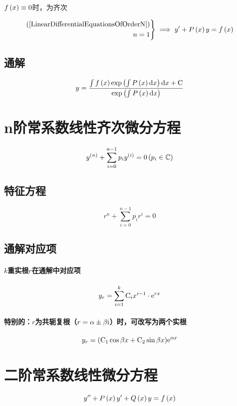 \documentclass{article}
\begin{document}
$f\left(x\right)\equiv0$时，为齐次

\[\left.\begin{aligned}
        \left(\ref{LinearDifferentialEquationsOfOrderN}\right) \\
        n=1
    \end{aligned}\right\}
    \implies
    y^\prime+P\left(x\right)y=f\left(x\right)\]

\subsection{通解}

\[y=\frac{\int{f\left(x\right)\exp\left(\int P\left(x\right)\mathrm dx\right)\mathrm dx}+\mathrm C}{\exp\left(\int P\left(x\right)\mathrm d x\right)}\]

\section{n阶常系数线性齐次微分方程}

\[y^{\left(n\right)}+\sum_{i=0}^{n-1}p_iy^{\left(i\right)}=0\left(p_i\in\mathbb C\right)\]

\subsection{特征方程}

\[r^n+\sum_{i=0}^{n-1}p_ir^i=0\]

\subsection{通解对应项}

\paragraph{$k$重实根$r$在通解中对应项}

\[y_r=\sum_{i=1}^k\mathrm C_ix^{i-1}\cdot\mathrm e^{rx}\]

\paragraph{特别的：$r$为共轭复根（$r=\alpha\pm\beta\mathrm i$）时，可改写为两个实根}

\[y_r=(\mathrm C_1\cos{\beta x}+\mathrm C_2\sin{\beta x})\mathrm e^{\alpha x}\]

\section{二阶常系数线性微分方程}

\[y^{\prime\prime}+P\left(x\right)y^\prime+Q\left(x\right)y=f\left(x\right)\]
\end{document}
